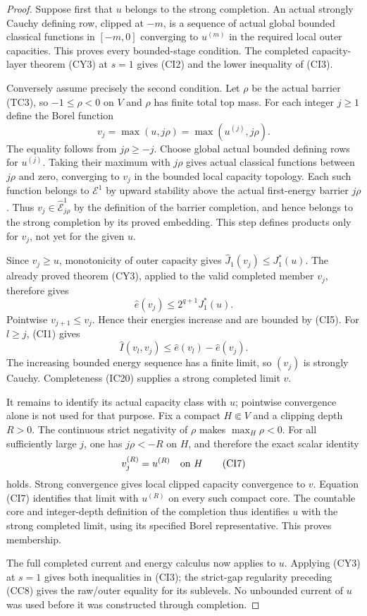 \documentclass[11pt,a4paper]{article}
\numberwithin{equation}{section}
\theoremstyle{definition}
\theoremstyle{remark}
\begin{document}
\begin{proof}
Suppose first that $u$ belongs to the strong completion.
An actual strongly Cauchy defining row, clipped at $-m$,
is a sequence of actual global bounded classical functions
in $[-m,0]$ converging to $u^{(m)}$ in the required local
outer capacities. This proves every bounded-stage condition.
The completed capacity-layer theorem (CY3) at $s=1$ gives
(CI2) and the lower inequality of (CI3).

Conversely assume precisely the second condition. Let $\rho$
be the actual barrier (TC3), so $-1\leq\rho<0$ on $V$ and
$\rho$ has finite total top mass. For each integer $j\geq1$
define the Borel function
\[
                     v_j=\max(u,j\rho)
                         =\max(u^{(j)},j\rho).
 \tag{CI4}
\]
The equality follows from $j\rho\geq-j$.
Choose global actual bounded defining rows for $u^{(j)}$.
Taking their maximum with $j\rho$ gives actual classical
functions between $j\rho$ and zero, converging to $v_j$
in the bounded local capacity topology. Each such function
belongs to $\mathcal E^1$ by upward stability above the
actual first-energy barrier $j\rho$. Thus
$v_j\in\widehat{\mathcal E}^1_{j\rho}$ by the definition
of the barrier completion, and hence belongs to the strong
completion by its proved embedding. This step defines
products only for $v_j$, not yet for the given $u$.

Since $v_j\geq u$, monotonicity of outer capacity gives
$\widehat J_1(v_j)\leq J_1^*(u)$.
The already proved theorem (CY3), applied to the valid
completed member $v_j$, therefore gives
\[
                    \widehat e(v_j)\leq2^{q+1}J_1^*(u).
 \tag{CI5}
\]
Pointwise $v_{j+1}\leq v_j$. Hence their energies increase
and are bounded by (CI5). For $l\geq j$, (CI1) gives
\[
                  \widehat I(v_l,v_j)
                           \leq\widehat e(v_l)-\widehat e(v_j).
 \tag{CI6}
\]
The increasing bounded energy sequence has a finite limit,
so $(v_j)$ is strongly Cauchy. Completeness (IC20) supplies
a strong completed limit $v$.

It remains to identify its actual capacity class with $u$;
pointwise convergence alone is not used for that purpose.
Fix a compact $H\Subset V$ and a clipping depth $R>0$.
The continuous strict negativity of $\rho$ makes
$\max_H\rho<0$. For all sufficiently large $j$, one has
$j\rho<-R$ on $H$, and therefore the exact scalar identity
\[
                              v_j^{(R)}=u^{(R)}
                                      \quad\hbox{on }H
 \tag{CI7}
\]
holds. Strong convergence gives local clipped capacity
convergence to $v$. Equation (CI7) identifies that limit
with $u^{(R)}$ on every such compact core. The countable
core and integer-depth definition of the completion thus
identifies $u$ with the strong completed limit, using its
specified Borel representative. This proves membership.

The full completed current and energy calculus now applies
to $u$. Applying (CY3) at $s=1$ gives both inequalities in
(CI3); the strict-gap regularity preceding (CC8) gives the
raw/outer equality for its sublevels. No unbounded current
of $u$ was used before it was constructed through completion.
\end{proof}
\end{document}

